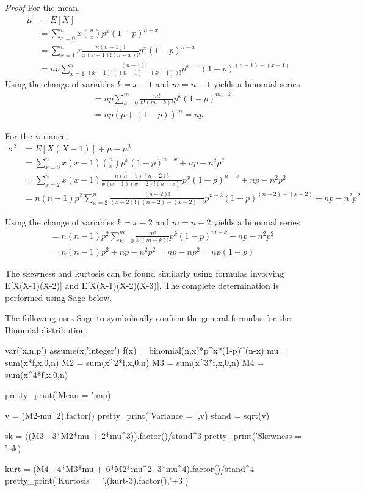 \documentclass[10pt,]{book}
\makeatletter
\renewcommand*{\proofname}{Proof}
\renewenvironment{proof}[1][\proofname]{\par
  \pushQED{\qed}%
  \normalfont \topsep6\p@\@plus6\p@\relax
  \trivlist
  \item\relax
    {\itshape
    #1\@addpunct{.}}\hspace\labelsep\ignorespaces
}{%
  \popQED\endtrivlist\@endpefalse
}
\numberwithin{equation}{section}
\makeatother
\begin{document}
\begin{proof}\hypertarget{proof-41}{}
\hypertarget{p-865}{}%
For the mean,%
\begin{align*}
\mu & = E[X] \\
& = \sum_{x=0}^{n} {x \binom{n}{x} p^x (1-p)^{n-x}}\\
& = \sum_{x=1}^{n} {x \frac{n(n-1)!}{x(x-1)!(n-x)!} p^x (1-p)^{n-x}}\\
& = np \sum_{x=1}^{n} {\frac{(n-1)!}{(x-1)!((n-1)-(x-1))!} p^{x-1} (1-p)^{(n-1)-(x-1)}}
\end{align*}
Using the change of variables \(k=x-1\) and \(m = n-1\) yields a binomial series%
\begin{align*}
& = np \sum_{k=0}^{m} {\frac{m!}{k!(m-k)!} p^k (1-p)^{m-k}}\\
& = np (p + (1-p))^m = np
\end{align*}
%
\par
\hypertarget{p-866}{}%
For the variance,%
\begin{align*}
\sigma^2 & = E[X(X-1)] + \mu - \mu^2 \\
& = \sum_{x=0}^{n} {x(x-1) \binom{n}{x} p^x (1-p)^{n-x}} + np - n^2p^2\\
& = \sum_{x=2}^{n} {x(x-1) \frac{n(n-1)(n-2)!}{x(x-1)(x-2)!(n-x)!} p^x (1-p)^{n-x}}  + np - n^2p^2\\
& = n(n-1)p^2 \sum_{x=2}^{n} {\frac{(n-2)!}{(x-2)!((n-2)-(x-2))!} p^{x-2} (1-p)^{(n-2)-(x-2)}} + np - n^2p^2
\end{align*}
%
\par
\hypertarget{p-867}{}%
Using the change of variables \(k=x-2\) and \(m = n-2\) yields a binomial series%
\begin{align*}
& = n(n-1)p^2  \sum_{k=0}^{m} {\frac{m!}{k!(m-k)!} p^k (1-p)^{m-k}} + np - n^2p^2\\
& = n(n-1)p^2 + np - n^2p^2 = np - np^2 = np(1-p)
\end{align*}
%
\par
\hypertarget{p-868}{}%
The skewness and kurtosis can be found similarly using formulas involving E[X(X-1)(X-2)] and E[X(X-1)(X-2)(X-3)]. The complete determination is performed using Sage below.%
\end{proof}
%
\par
\hypertarget{p-869}{}%
The following uses Sage to symbolically confirm the general formulas for the Binomial distribution.%
\par
\hypertarget{p-870}{}%
\leavevmode%
\begin{sageinput}
var('x,n,p')
assume(x,'integer')
f(x) = binomial(n,x)*p^x*(1-p)^(n-x)
mu = sum(x*f,x,0,n)
M2 = sum(x^2*f,x,0,n)
M3 = sum(x^3*f,x,0,n)
M4 = sum(x^4*f,x,0,n)

pretty_print('Mean = ',mu)

v = (M2-mu^2).factor()
pretty_print('Variance = ',v)
stand = sqrt(v)

sk = ((M3 - 3*M2*mu + 2*mu^3)).factor()/stand^3
pretty_print('Skewness = ',sk)

kurt = (M4 - 4*M3*mu + 6*M2*mu^2 -3*mu^4).factor()/stand^4
pretty_print('Kurtosis = ',(kurt-3).factor(),'+3')
\end{sageinput}
\end{document}
